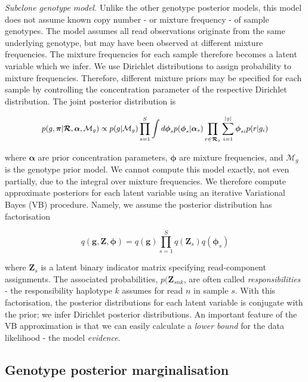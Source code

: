 \documentclass[notitlepage, twocolumn]{article}
\begin{document}
\emph{Subclone genotype model.} Unlike the other genotype posterior models, this model does not assume known copy number - or mixture frequency - of sample genotypes. The model assumes all read observations originate from the same underlying genotype, but may have been observed at different mixture frequencies. The mixture frequencies for each sample therefore becomes a latent variable which we infer. We use Dirichlet distributions to assign probability to mixture frequencies. Therefore, different mixture priors may be specified for each sample by controlling the concentration parameter of the respective Dirichlet distribution. The joint posterior distribution is 

\begin{equation*}
\small
p(g, \boldsymbol{\pi} | \boldsymbol{\mathcal{R}}, \boldsymbol{\alpha}, \mathcal{M}_g) \propto p(g | \mathcal{M}_g) \prod_{s=1}^S \int d \boldsymbol{\phi}_s p(\boldsymbol{\phi}_s | \boldsymbol{\alpha}_s) \prod_{r \in \boldsymbol{\mathcal{R}}_s} \sum_{i = 1}^{|g|} \boldsymbol{\phi}_{si} p(r | g_i)
\end{equation*}

where $\boldsymbol{\alpha}$ are prior concentration parameters, $\boldsymbol{\phi}$ are mixture frequencies, and $\mathcal{M}_g$ is the genotype prior model. We cannot compute this model exactly, not even partially, due to the integral over mixture frequencies. We therefore compute approximate posteriors for each latent variable using an iterative Variational Bayes (VB) procedure. Namely, we assume the posterior distribution has factorisation

\begin{equation*}
    q(\boldsymbol{g}, \boldsymbol{Z}, \boldsymbol{\phi}) = q(\boldsymbol{g}) \prod_{s = 1}^S q(\boldsymbol{Z}_s) q(\boldsymbol{\phi}_s)
\end{equation*}

where $\boldsymbol{Z}_s$ is a latent binary indicator matrix specifying read-component assignments. The associated probabilities, $p(\boldsymbol{Z}_{snk}$, are often called \emph{responsibilities} - the responsibility haplotype $k$ assumes for read $n$ in sample $s$. With this factorisation, the posterior distributions for each latent variable is conjugate with the prior; we infer Dirichlet posterior distributions. An important feature of the VB approximation is that we can easily calculate a \emph{lower bound} for the data likelihood - the model \emph{evidence}.

\subsection*{Genotype posterior marginalisation}
\end{document}
